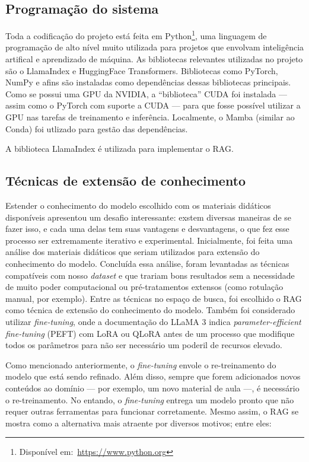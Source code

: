 \documentclass[journal]{IEEEtran}
\begin{document}
\subsection{Programação do sistema}

\noindent%
Toda a codificação do projeto está feita em Python\footnote{Disponível em:~\url{https://www.python.org}}, uma linguagem de programação de alto nível muito utilizada para projetos que envolvam inteligência artifical e aprendizado de máquina.
As bibliotecas relevantes utilizadas no projeto são o LlamaIndex e HuggingFace Transformers.
Bibliotecas como PyTorch, NumPy e afins são instaladas como dependências dessas bibliotecas principais.
Como se possui uma GPU da NVIDIA, a ``biblioteca'' CUDA foi instalada --- assim como o PyTorch com suporte a CUDA --- para que fosse possível utilizar a GPU nas tarefas de treinamento e inferência.
Localmente, o Mamba (similar ao Conda) foi utlizado para gestão das dependências.

A biblioteca LlamaIndex é utilizada para implementar o RAG\@.

\subsection{Técnicas de extensão de conhecimento}

\noindent%
Estender o conhecimento do modelo escolhido com os materiais didáticos disponíveis apresentou um desafio interessante: exstem diversas maneiras de se fazer isso, e cada uma delas tem suas vantagens e desvantagens, o que fez esse processo ser extremamente iterativo e experimental.
Inicialmente, foi feita uma análise dos materiais didáticos que seriam utilizados para extensão do conhecimento do modelo.
Concluída essa análise, foram levantadas as técnicas compatíveis com nosso \textit{dataset} e que trariam bons resultados sem a necessidade de muito poder computacional ou pré-tratamentos extensos (como rotulação manual, por exemplo).
Entre as técnicas no espaço de busca, foi escolhido o RAG como técnica de extensão do conhecimento do modelo.
Também foi considerado utilizar \textit{fine-tuning}, onde a documentação do LLaMA 3 indica \textit{parameter-efficient fine-tuning} (PEFT) com LoRA ou QLoRA antes de um processo que modifique todos os parâmetros para não ser necessário um poderil de recursos elevado.

Como mencionado anteriormente, o \textit{fine-tuning} envole o re-treinamento do modelo que está sendo refinado.
Além disso, sempre que forem adicionados novos conteúdos ao domínio --- por exemplo, um novo material de aula ---, é necessário o re-treinamento.
No entando, o \textit{fine-tuning} entrega um modelo pronto que não requer outras ferramentas para funcionar corretamente.
Mesmo assim, o RAG se mostra como a alternativa mais atraente por diversos motivos; entre eles:
\end{document}
